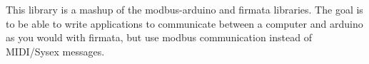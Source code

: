This library is a mashup of the modbus-\/arduino and firmata libraries. The goal is to be able to write applications to communicate between a computer and arduino as you would with firmata, but use modbus communication instead of MIDI/\+Sysex messages. 
